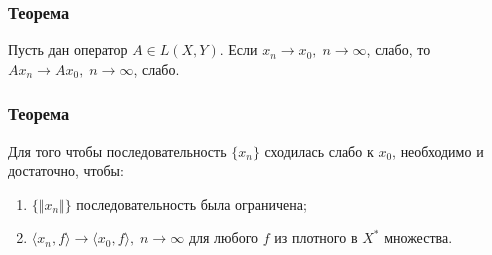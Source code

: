 \subsubsection*{Теорема}
Пусть дан оператор $A \in L(X, Y)$. Если $x_n \rightarrow x_0, \; n\rightarrow \infty$, слабо, то $Ax_n \rightarrow Ax_0,\;n\rightarrow\infty$, слабо\cite[с.~177]{trenogin}.

\subsubsection*{Теорема}
Для того чтобы последовательность $\{x_n\}$ сходилась слабо к $x_0$, необходимо и достаточно, чтобы:
\begin{enumerate}
	\itemsep0pt
	\item $\{\Vert x_n \Vert\}$ последовательность была ограничена;
	\item $\langle x_n, f\rangle \rightarrow \langle x_0, f\rangle,\;n\rightarrow \infty$ для любого $f$ из плотного в $X^*$ множества.
\end{enumerate}

